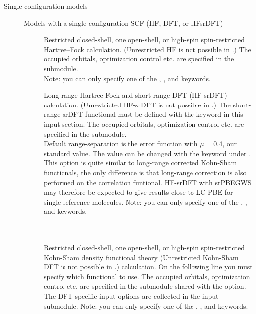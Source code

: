 \begin{description}

\item[{\color{blue}Single configuration models}] Models with a single configuration SCF (HF, DFT, or HFsrDFT)

\begin{description}

\item[]
  Restricted closed-shell, one open-shell, or high-spin spin-restricted Hartree--Fock calculation.
  (Unrestricted HF is not possible in \dalton.)
  The occupied orbitals, optimization control etc. are specified in the
   submodule. \\
  Note: you can only specify one of the , , and  keywords.

\item[]
  Long-range Hartree-Fock and short-range DFT (HF-srDFT) calculation. 
  (Unrestricted HF-srDFT is not possible in \dalton.)
  The short-range srDFT functional must be defined with the  keyword in this input section.
  The occupied orbitals, optimization control etc. are specified in the
   submodule. \\
  Default range-separation is the error function with $\mu = 0.4$, our standard value.
  The value can be changed with the  keyword under . \\
  This option is quite similar to long-range corrected Kohn-Sham functionals, the only difference
  is that long-range correction is also performed on the correlation funtional.
  HF-srDFT with srPBEGWS may therefore be expected to give results close to LC-PBE for single-reference molecules.
  Note: you can only specify one of the , , and  keywords.

\item[] \ \\
   \\
  Restricted closed-shell, one open-shell, or high-spin spin-restricted Kohn-Sham density functional
  theory
  (Unrestricted Kohn-Sham DFT is not possible in \dalton.)
  calculation.  On the following line you must specify which
  functional to use.  The occupied orbitals, optimization control
  etc. are specified in the  submodule shared with
  the  option. The DFT specific input options are
  collected in the  input submodule.
  Note: you can only specify one of the , , and  keywords.


\end{description}
\end{description}
